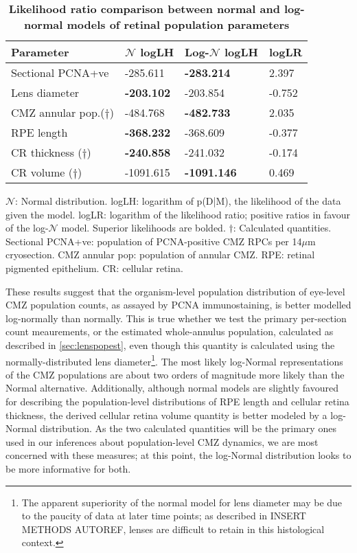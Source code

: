 \begin{table}[!ht]
    \centering
    \caption{
    {\bf Likelihood ratio comparison between normal and log-normal models of retinal population parameters}}
    \begin{tabular}{|l|l|l|l|}
    \hline
    {\bf Parameter} & {\bf $\mathcal{N}$ logLH} & {\bf Log-$\mathcal{N}$ logLH} & {\bf logLR} \\ \hline
    Sectional PCNA+ve & -285.611 & {\bf -283.214} & 2.397\\ \hline
    Lens diameter & {\bf -203.102} & -203.854 & -0.752\\ \hline
    CMZ annular pop.($\dagger$)  & -484.768 & {\bf -482.733} & 2.035\\ \hline
    RPE length & {\bf -368.232} & -368.609 & -0.377\\ \hline
    CR thickness ($\dagger$) & {\bf -240.858} & -241.032 & -0.174\\ \hline
    CR volume ($\dagger$) & -1091.615 & {\bf -1091.146} & 0.469\\ \hline
    \end{tabular}
    \begin{flushleft} $\mathcal{N}$: Normal distribution. logLH: logarithm of p(D|M), the likelihood of the data given the model. logLR: logarithm of the likelihood ratio; positive ratios in favour of the log-$\mathcal{N}$ model. Superior likelihoods are bolded. $\dagger$: Calculated quantities. Sectional PCNA+ve: population of PCNA-positive CMZ RPCs per 14$\mu$m cryosection. CMZ annular pop: population of annular CMZ. RPE: retinal pigmented epithelium. CR: cellular retina.
    \end{flushleft}
    \label{PLHRtable}
\end{table}

These results suggest that the organism-level population distribution of eye-level CMZ population counts, as assayed by PCNA immunostaining, is better modelled log-normally than normally. This is true whether we test the primary per-section count meaurements, or the estimated whole-annulus population, calculated as described in \autoref{sec:lenspopest}, even though this quantity is calculated using the normally-distributed lens diameter\footnote{The apparent superiority of the normal model for lens diameter may be due to the paucity of data at later time points; as described in INSERT METHODS AUTOREF, lenses are difficult to retain in this histological context.}. The most likely log-Normal representations of the CMZ populations are about two orders of magnitude more likely than the Normal alternative. Additionally, although normal models are slightly favoured for describing the population-level distributions of RPE length and cellular retina thickness, the derived cellular retina volume quantity is better modeled by a log-Normal distribution. As the two calculated quantities will be the primary ones used in our inferences about population-level CMZ dynamics, we are most concerned with these measures; at this point, the log-Normal distribution looks to be more informative for both.

